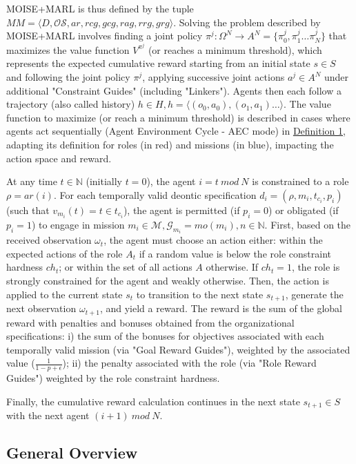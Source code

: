 \documentclass[sigconf,anonymous]{aamas}
\begin{document}
MOISE+MARL is thus defined by the tuple $MM = \langle D, \mathcal{OS}, ar, rcg, \allowbreak gcg, rag, rrg, grg\rangle$. Solving the problem described by MOISE+MARL involves finding a joint policy $\pi^{j}: \Omega^{N} \to A^{N} = \{\pi^j_0,\pi^j_1\dots\pi^j_N\}$ that maximizes the value function $V^{\pi^{j}}$ (or reaches a minimum threshold), which represents the expected cumulative reward starting from an initial state $s \in S$ and following the joint policy $\pi^{j}$, applying successive joint actions $a^{j} \in A^N$ under additional "Constraint Guides" (including "Linkers"). Agents then each follow a trajectory (also called history) $h \in H, h = \langle(o_0,a_0), (o_1,a_1)\dots\rangle$. The value function to maximize (or reach a minimum threshold) is described in cases where agents act sequentially (Agent Environment Cycle - AEC mode) in \hyperref[eq:single_value_function]{Definition 1}, adapting its definition for roles (in red) and missions (in blue), impacting the action space and reward.

At any time $t \in \mathbb{N}$ (initially $t = 0$), the agent $i = t \ mod \ N$ is constrained to a role $\rho = ar(i)$. For each temporally valid deontic specification $d_i = (\rho,m_i,t_{c_i},p_i)$ (such that $v_{m_i}(t) = t \in t_{c_i}$), the agent is permitted (if $p_i = 0$) or obligated (if $p_i = 1$) to engage in mission $m_i \in \mathcal{M}, \mathcal{G}_{m_i} = mo(m_i), n \in \mathbb{N}$.
%
First, based on the received observation $\omega_t$, the agent must choose an action either: within the expected actions of the role $A_t$ if a random value is below the role constraint hardness $ch_t$; or within the set of all actions $A$ otherwise. If $ch_t = 1$, the role is strongly constrained for the agent and weakly otherwise.
%
Then, the action is applied to the current state $s_t$ to transition to the next state $s_{t+1}$, generate the next observation $\omega_{t+1}$, and yield a reward. The reward is the sum of the global reward with penalties and bonuses obtained from the organizational specifications: \quad i) the sum of the bonuses for objectives associated with each temporally valid mission (via "Goal Reward Guides"), weighted by the associated value ($\frac{1}{1-p+\epsilon}$); \quad ii) the penalty associated with the role (via "Role Reward Guides") weighted by the role constraint hardness.

Finally, the cumulative reward calculation continues in the next state $s_{t+1} \in S$ with the next agent $(i+1) \ mod \ N$.

\subsection{General Overview}
\end{document}
